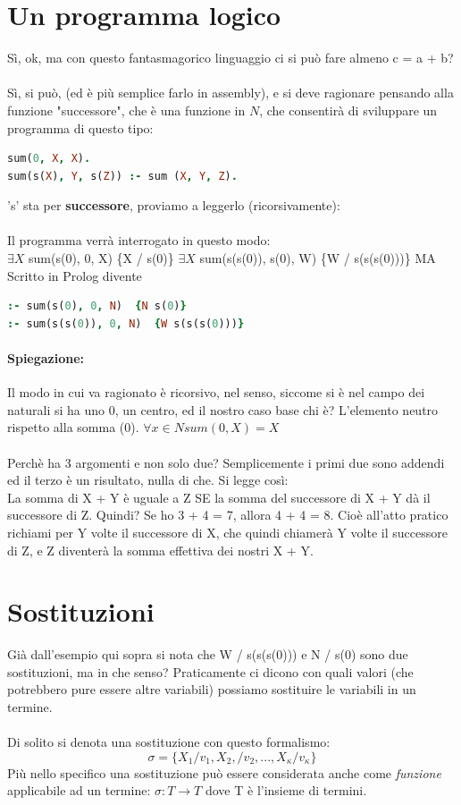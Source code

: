 \documentclass[12pt, a4paper, openany, oneside]{book}
\begin{document}
\section{Un programma logico}
Sì, ok, ma con questo fantasmagorico linguaggio ci si può fare almeno c = a + b?
\\ \\
Sì, si può, (ed è più semplice farlo in assembly), e si deve ragionare pensando
alla funzione "successore", che è una funzione in $N$, che consentirà di 
sviluppare un programma di questo tipo:
\begin{lstlisting}[language=prolog]
sum(0, X, X).
sum(s(X), Y, s(Z)) :- sum (X, Y, Z).
\end{lstlisting} 
's' sta per \textbf{successore}, proviamo a leggerlo (ricorsivamente): \\ \\
Il programma verrà interrogato in questo modo: \\
$\exists X$ sum(s(0), 0, X) \{X / s(0)\}
$\exists X$ sum(s(s(0)), s(0), W) \{W / s(s(s(0)))\} MA
Scritto in Prolog divente 
\begin{lstlisting}[language=prolog]
:- sum(s(0), 0, N)  {N s(0)}
:- sum(s(s(0)), 0, N)  {W s(s(s(0)))}
\end{lstlisting}
\paragraph{Spiegazione: } Il modo in cui va ragionato è ricorsivo, nel senso, 
siccome si è nel campo dei naturali si ha uno 0, un centro, ed il nostro caso
base chi è? L'elemento neutro rispetto alla somma (0). 
$\forall x \in N sum(0, X) = X$ \\ \\
Perchè ha 3 argomenti e non solo due? Semplicemente i primi due sono addendi ed 
il terzo è un risultato, nulla di che. Si legge così: \\
La somma di X + Y è uguale a Z SE la somma del successore di X + Y dà il successore di Z.
Quindi? Se ho 3 + 4 = 7, allora 4 + 4 = 8. Cioè all'atto pratico richiami per Y
volte il successore di X, che quindi chiamerà Y volte il successore di Z, e Z
diventerà la somma effettiva dei nostri X + Y.
\section{Sostituzioni}
Già dall'esempio qui sopra si nota che {W / s(s(s(0)))} e {N / s(0)} sono due
sostituzioni, ma in che senso? Praticamente ci dicono con quali valori (che 
potrebbero pure essere altre variabili) possiamo sostituire le variabili in un 
termine. \\ \\
Di solito si denota una sostituzione con questo formalismo:
\[
\sigma = \{ X_{1} / v_{1}, X_{2}, / v_{2}, ... , X_{\kappa} / v_{\kappa}\}
\]
Più nello specifico una sostituzione può essere considerata anche come 
\textit{funzione} applicabile ad un termine: $\sigma : T \to T$ dove T è l'insieme
di termini. \\ 
\end{document}
